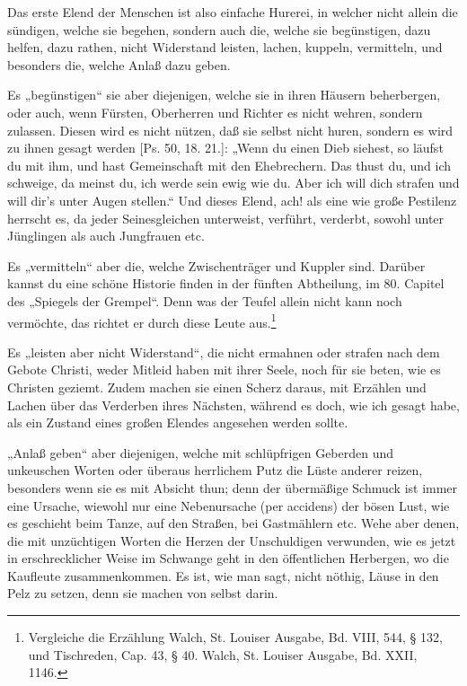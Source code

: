 Das erste Elend der Menschen ist also einfache Hurerei, in welcher nicht allein die sündigen, welche sie begehen, sondern auch die, welche sie begünstigen, dazu helfen, dazu rathen, nicht Widerstand leisten, lachen, kuppeln, vermitteln, und besonders die, welche Anlaß dazu geben.

Es „begünstigen“ sie aber diejenigen, welche sie in ihren Häusern beherbergen, oder auch, wenn Fürsten, Oberherren und Richter es nicht wehren, sondern zulassen. Diesen wird es nicht nützen, daß sie selbst nicht huren, sondern es wird zu ihnen gesagt werden [Ps. 50, 18. 21.]: „Wenn du einen Dieb siehest, so läufst du mit ihm, und hast Gemeinschaft mit den Ehebrechern. Das thust du, und ich schweige, da meinst du, ich werde sein ewig wie du. Aber ich will dich strafen und will dir’s unter Augen stellen.“ Und dieses Elend, ach! als eine wie große Pestilenz herrscht es, da jeder Seinesgleichen unterweist, verführt, verderbt, sowohl unter Jünglingen als auch Jungfrauen etc.

Es „vermitteln“ aber die, welche Zwischenträger und Kuppler sind. Darüber kannst du eine schöne Historie finden in der fünften Abtheilung, im 80. Capitel des „Spiegels der Grempel“. Denn was der Teufel allein nicht kann noch vermöchte, das richtet er durch diese Leute aus.\footnote{Vergleiche die Erzählung Walch, St. Louiser Ausgabe, Bd. VIII, 544, § 132, und Tischreden, Cap. 43, § 40. Walch, St. Louiser Ausgabe, Bd. XXII, 1146.}

Es „leisten aber nicht Widerstand“, die nicht ermahnen oder strafen nach dem Gebote Christi, weder Mitleid haben mit ihrer Seele, noch für sie beten, wie es Christen geziemt. Zudem machen sie einen Scherz daraus, mit Erzählen und Lachen über das Verderben ihres Nächsten, während es doch, wie ich gesagt habe, als ein Zustand eines großen Elendes angesehen werden sollte.

„Anlaß geben“ aber diejenigen, welche mit schlüpfrigen Geberden und unkeuschen Worten oder überaus herrlichem Putz die Lüste anderer reizen, besonders wenn sie es mit Absicht thun; denn der übermäßige Schmuck ist immer eine Ursache, wiewohl nur eine Nebenursache (per accidens) der bösen Lust, wie es geschieht beim Tanze, auf den Straßen, bei Gastmählern etc. Wehe aber denen, die mit unzüchtigen Worten die Herzen der Unschuldigen verwunden, wie es jetzt in erschrecklicher Weise im Schwange geht in den öffentlichen Herbergen, wo die Kaufleute zusammenkommen. Es ist, wie man sagt, nicht nöthig, Läuse in den Pelz zu setzen, denn sie machen von selbst darin.

